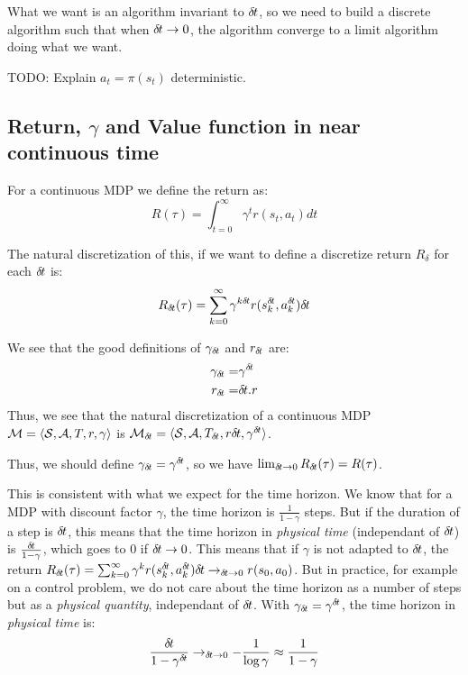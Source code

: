 What we want is an algorithm invariant to ${\delta\hspace{-.1em}t}$, so we need to build a discrete algorithm such that when ${\delta\hspace{-.1em}t} \rightarrow 0$, the algorithm converge to a limit algorithm doing what we want.

TODO: Explain $a_t = \pi(s_t)$ deterministic.

\subsection{Return, $\gamma$ and Value function in near continuous time}
\label{sec:ret-gamma-v}

For a continuous MDP we define the return as:
\begin{equation}
  \label{eq:continuous-return}
  R(\tau) = \int_{t=0}^\infty\gamma^tr(s_t, a_t)dt
\end{equation}

The natural discretization of this, if we want to define a discretize return $R_\delta$ for each ${\delta\hspace{-.1em}t}$ is:
\begin{equation}
  \label{eq:discretized-return}
  R_{\delta\hspace{-.1em}t}(\tau) = \sum_{k=0}^\infty\gamma^{k{\delta\hspace{-.1em}t}}r(s^{\delta\hspace{-.1em}t}_k, a^{\delta\hspace{-.1em}t}_k){\delta\hspace{-.1em}t}
\end{equation}

We see that the good  definitions of $\gamma_{\delta\hspace{-.1em}t}$ and $r_{\delta\hspace{-.1em}t}$ are:
\begin{align}
  \gamma_{\delta\hspace{-.1em}t} =& \gamma^{\delta\hspace{-.1em}t}\\
  r_{\delta\hspace{-.1em}t} =& {\delta\hspace{-.1em}t} . r
\end{align}
Thus, we see that the natural discretization of a continuous MDP ${\cal M} = \langle {\cal S}, {\cal A}, T, r, \gamma\rangle$ is ${\cal M}_{\delta\hspace{-.1em}t} = \langle {\cal S}, {\cal A}, T_{\delta\hspace{-.1em}t}, r{\delta\hspace{-.1em}t}, \gamma^{\delta\hspace{-.1em}t}\rangle$.

Thus, we should define $\gamma_{\delta\hspace{-.1em}t} = \gamma^{\delta\hspace{-.1em}t}$, so we have $\lim_{{\delta\hspace{-.1em}t} \rightarrow 0} R_{\delta\hspace{-.1em}t}(\tau)  = R(\tau)$. 


This is consistent with what we expect for the time horizon. We know  that for a MDP with discount factor $\gamma$, the time horizon is $\frac{1}{1-\gamma}$ steps. But if the duration of a step is ${\delta\hspace{-.1em}t}$, this means that the time horizon in \emph{physical time} (independant of ${\delta\hspace{-.1em}t}$) is $\frac{{\delta\hspace{-.1em}t}}{1-\gamma}$, which goes to 0 if ${\delta\hspace{-.1em}t} \rightarrow 0$. This means that if $\gamma$ is not adapted to ${\delta\hspace{-.1em}t}$, the return $R_{\delta\hspace{-.1em}t}(\tau) = \sum_{k=0}^\infty\gamma^{k}r(s^{\delta\hspace{-.1em}t}_k, a^{\delta\hspace{-.1em}t}_k){\delta\hspace{-.1em}t} \rightarrow_{{\delta\hspace{-.1em}t}\rightarrow 0} r(s_0, a_0)$.  But in practice, for example on a control problem, we do not care about the time horizon as a number of steps but as a \emph{physical quantity}, independant of ${\delta\hspace{-.1em}t}$. With $\gamma_{\delta\hspace{-.1em}t} = \gamma^{\delta\hspace{-.1em}t}$, the time horizon in \emph{physical time} is:
\begin{equation}
  \label{eq:time-horizon}
  \frac{{\delta\hspace{-.1em}t}}{1-\gamma^{\delta\hspace{-.1em}t}} \rightarrow_{{\delta\hspace{-.1em}t} \rightarrow 0} - \frac{1}{\log \gamma} \approx \frac{1}{1-\gamma}
\end{equation}



